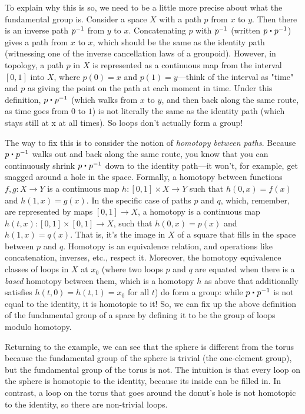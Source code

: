 To explain why this is so, we need to be a little more precise about
what the fundamental group is.  Consider a space $X$ with a path $p$
from $x$ to $y$.  Then there is an inverse path $\mathord{{p}^{-1}}$ from $y$ to
$x$.  Concatenating $p$ with $\mathord{{p}^{-1}}$ (written $p \ct \opp p$) gives a
path from $x$ to $x$, which should be the same as the identity path
(witnessing one of the inverse cancellation laws of a groupoid).
However, in topology, a path $p$ in $X$ is represented as a continuous
map from the interval $[0,1]$ into $X$, where $p(0) = x$ and $p(1) =
y$---think of the interval as "time" and $p$ as giving the point on the
path at each moment in time.  Under this definition, $p \ct \opp p$
(which walks from $x$ to $y$, and then back along the same route, as
time goes from $0$ to $1$) is not literally the same as the identity
path (which stays still at x at all times).  So loops don't actually
form a group!

The way to fix this is to consider the notion of \emph{homotopy between
paths}. Because $p \ct \opp p$ walks out and back along the same route, you know
that you can continuously shrink $p \ct \opp p$ down to the identity path---it
won't, for example, get snagged around a hole in the space.  Formally, a
homotopy between functions $f, g : X \rightarrow Y$ is a continuous map 
$h : [0,1] \times X \rightarrow Y$ such that $h(0,x) = f(x)$ and $h(1,x) = g(x)$.  In the specific case
of paths $p$ and $q$, which, remember, are represented by maps $[0,1] \rightarrow X$, a
homotopy is a continuous map $h(t,x) : [0,1] \times [0,1] \rightarrow X$, such that
$h(0,x) = p(x)$ and $h(1,x) = q(x)$.  That is, it's the image in $X$ of a
square that fills in the space between $p$ and $q$.  Homotopy is an
equivalence relation, and operations like concatenation, inverses,
etc., respect it.  Moreover, the homotopy equivalence classes of loops in
$X$ at $x_0$ (where two loops $p$ and $q$ are equated when there is a \emph{based}
homotopy between them, which is a homotopy $h$ as above that additionally
satisfies $h(t,0) = h(t,1) = x_0$ for all $t$) do form a group: while $p \ct \opp p$
is not equal to the identity, it is homotopic to it!  So, we can fix up
the above definition of the fundamental group of a space by defining it
to be the group of loops modulo homotopy.

Returning to the example, we can see that the sphere is different from
the torus because the fundamental group of the sphere is trivial (the
one-element group), but the fundamental group of the torus is not.  The
intuition is that every loop on the sphere is homotopic to the identity,
because its inside can be filled in.  In contrast, a loop on the torus that
goes around the donut's hole is not homotopic to the identity, so there
are non-trivial loops.

